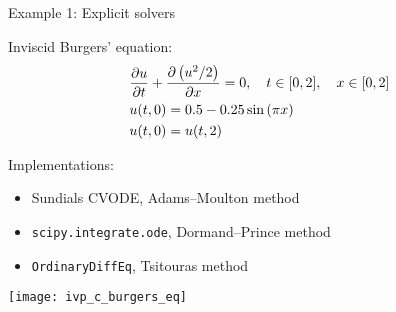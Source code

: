 \documentclass[10pt, aspectratio=169, progressbar=frametitle]{beamer}
\begin{document}
\begin{frame}{Example 1: Explicit solvers}
  \begin{minipage}{\dimexpr0.6\textwidth - 2\tabcolsep}
  Inviscid Burgers' equation:
    \begin{align*}
      &\pdv{u}{t} + \pdv{\left( u^{2} / 2 \right)}{x} = 0,
      \quad t \in [0, 2], \quad x \in [0, 2] \\
      &u(t, 0) = 0.5 - 0.25 \sin \left( \pi x \right)\\
      &u(t, 0) = u(t, 2)
    \end{align*}

    Implementations:
    \begin{itemize}
      \item Sundials CVODE, Adams--Moulton method
      \item \texttt{scipy.integrate.ode}, Dormand--Prince method
      \item \texttt{OrdinaryDiffEq}, Tsitouras method
    \end{itemize}
  \end{minipage}\hfill
  \begin{minipage}{\dimexpr0.4\textwidth - 2\tabcolsep}
    \texttt{[image: ivp\_c\_burgers\_eq]}
  \end{minipage}
\end{frame}
\end{document}
